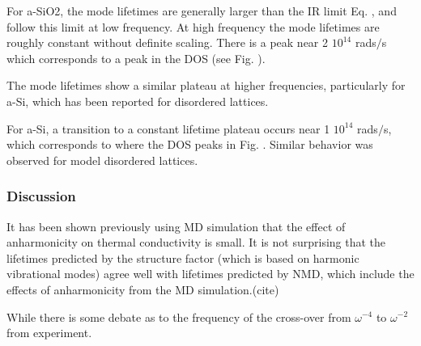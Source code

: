 \documentclass[aps,prb,twocolumn,superscriptaddress,footinbib,amsmath,amssymb,floatfix]{revtex4}
\begin{document}
For a-SiO2, the mode lifetimes are generally larger than the 
IR limit Eq. , and follow this limit at low frequency. 
At high frequency the mode lifetimes are roughly constant 
without definite scaling. There is a peak near 
2 $10^{14}$ rads$/$s which corresponds to a peak in the DOS (see Fig. ).  

The mode lifetimes show a similar 
plateau at higher frequencies, particularly for a-Si, which has been 
reported for disordered lattices.\cite{larkin_predicting_2013}

For a-Si, a transition to a constant lifetime plateau occurs near 
1 $10^{14}$ rads$/$s, which corresponds to where the DOS peaks in Fig. . 
Similar behavior was observed for model disordered lattices.
\cite{he_heat_2011,larkin_predicting_2013} 





\subsubsection{\label{S:Life_NMD}Discussion}

It has been shown previously using MD simulation that the effect of 
anharmonicity on thermal conductivity is small.
\cite{lee_molecular-dynamics_1991} It is not surprising that the 
lifetimes predicted by the structure factor (which is based on harmonic 
vibrational modes) agree well with lifetimes predicted by NMD, which 
include the effects of anharmonicity from the MD simulation.(cite)  

While there is some debate as to the frequency of the cross-over from 
$\omega^{-4}$ to $\omega^{-2}$ from experiment.
\cite{masciovecchio_evidence_2006,zink_thermal_2006,baldi_sound_2010} 
\end{document}
